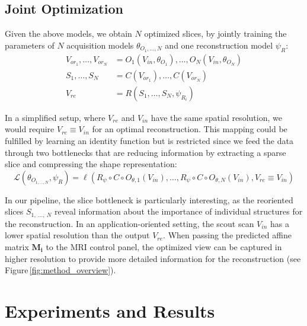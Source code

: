     \subsection{Joint Optimization}
     Given the above models, we obtain $N$ optimized slices, by jointly training the parameters of $N$ acquisition models $\theta_{O_1,\dots,N}$ and one reconstruction model $\psi_R$:
    \begin{align}
        V_{or_1},\dots,V_{or_N} &= O_1\left(V_{in},\theta_{O_1}\right),\dots, O_N\left(V_{in}, \theta_{O_N}\right) \label{eq:joint_slicing}\\
        S_1,\dots,S_N &= C\left(V_{or_1}\right), \dots, C\left(V_{or_N}\right)\\
        V_{re} &= R\left(S_{1},\dots,S_{N},\psi_{R_i}\right)\label{eq:joint_recon}
    \end{align}

   In a simplified setup, where $V_{re}$ and $V_{in}$ have the same spatial resolution, we would require $ V_{re} \equiv V_{in}$ for an optimal reconstruction.
    This mapping could be fulfilled by learning an identity function but is restricted since we feed the data through two bottlenecks that are reducing information by extracting a sparse slice and compressing the shape representation:
    \begin{equation}
         \mathcal{L}\left(\theta_{O_{1,\dots,N}}, \psi_R\right) = \ell\left(R_{\psi} \circ C \circ O_{\theta,1}\left(V_{in}\right),\dots, R_{\psi} \circ C \circ O_{\theta,N}\left(V_{in}\right), V_{re} \equiv V_{in}\right)\label{eq:loss}
    \end{equation}

    In our pipeline, the slice bottleneck is particularly interesting, as the reoriented slices $S_{1,~\dots,~N}$ reveal information about the importance of individual structures for the reconstruction.
    In an application-oriented setting, the scout scan $V_{in}$ has a lower spatial resolution than the output $V_{re}$.
    When passing the predicted affine matrix $\mathbf{M_i}$ to the MRI control panel, the optimized view can be captured in higher resolution to provide more detailed information for the reconstruction (see Figure\,\ref{fig:method_overview}).

\section{Experiments and Results}
